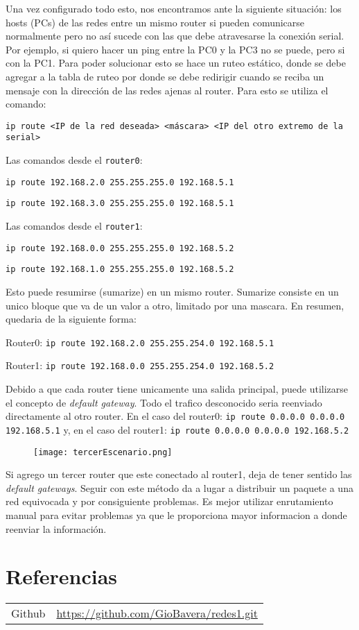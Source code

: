 \documentclass{article}
\begin{document}
Una vez configurado todo esto, nos encontramos ante la siguiente situación: los hosts (PCs) de las redes entre un mismo router si pueden comunicarse normalmente pero no así sucede con las que debe atravesarse la conexión serial. Por ejemplo, si quiero hacer un ping entre la PC0 y la PC3 no se puede, pero si con la PC1. Para poder solucionar esto se hace un ruteo estático, donde se debe agregar a la tabla de ruteo por donde se debe redirigir cuando se reciba un mensaje con la dirección de las redes ajenas al router. Para esto se utiliza el comando:

\texttt{ip route \textless IP de la red deseada\textgreater \ \textless máscara\textgreater \ \textless IP del otro extremo de la serial\textgreater}

Las comandos desde el \texttt{router0}:

\texttt{ip route 192.168.2.0 255.255.255.0 192.168.5.1}

\texttt{ip route 192.168.3.0 255.255.255.0 192.168.5.1}

Las comandos desde el \texttt{router1}:

\texttt{ip route 192.168.0.0 255.255.255.0 192.168.5.2}

\texttt{ip route 192.168.1.0 255.255.255.0 192.168.5.2}

Esto puede resumirse (sumarize) en un mismo router. Sumarize consiste en un unico bloque que va de un valor a otro, limitado por una mascara. En resumen, quedaria de la siguiente forma:

Router0: \texttt{ip route 192.168.2.0 255.255.254.0 192.168.5.1}

Router1: \texttt{ip route 192.168.0.0 255.255.254.0 192.168.5.2}

Debido a que cada router tiene unicamente una salida principal, puede utilizarse el concepto de \textit{default gateway}. Todo el trafico desconocido seria reenviado directamente al otro router. En el caso del router0: \texttt{ip route 0.0.0.0 0.0.0.0 192.168.5.1} y, en el caso del router1: \texttt{ip route 0.0.0.0 0.0.0.0 192.168.5.2}

\begin{figure} [h]
    \centering
    \texttt{[image: tercerEscenario.png]}
    \label{fig:enter-label}
\end{figure}

Si agrego un tercer router que este conectado al router1, deja de tener sentido las \textit{default gateways}. Seguir con este método da a lugar a distribuir un paquete a una red equivocada y por consiguiente problemas. Es mejor utilizar enrutamiento manual para evitar problemas ya que le proporciona mayor informacion a donde reenviar la información. 

\section{Referencias}
\begin{tabular}{ll}
Github         & \url{https://github.com/GioBavera/redes1.git} \\
\end{tabular}
\end{document}
